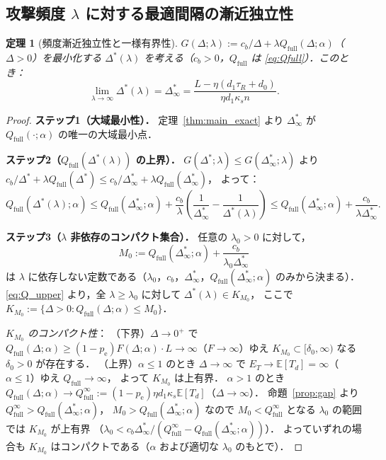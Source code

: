 \documentclass[12pt,a4paper]{article}
\theoremstyle{plain}
\newtheorem{theorem}{定理}[section]
\theoremstyle{definition}
\theoremstyle{remark}
\newcommand{\E}{\mathbb{E}}
\newcommand{\pe}{p_{\mathrm{e}}}
\newcommand{\Qf}{Q_{\mathrm{full}}}
\newcommand{\Dopt}{\Delta^{*}}
\newcommand{\Dinf}{\Delta^{*}_{\infty}}
\begin{document}
\subsection{攻撃頻度 $\lambda$ に対する最適間隔の漸近独立性}

\begin{theorem}[頻度漸近独立性と一様有界性]\label{thm:convergence}
$G(\Delta;\lambda):=c_b/\Delta+\lambda\Qf(\Delta;\alpha)$（$\Delta>0$）を最小化する
$\Dopt(\lambda)$ を考える（$c_b>0$，$\Qf$ は \eqref{eq:Qfull}）．このとき：
\begin{equation}\label{eq:limit}
\lim_{\lambda\to\infty}\Dopt(\lambda)=\Dinf=\frac{L-\eta(d_1\tau_R+d_0)}{\eta d_1\kappa_s n}.
\end{equation}
\end{theorem}

\begin{proof}
\textbf{ステップ1（大域最小性）．}
定理~\ref{thm:main_exact} より $\Dinf$ が $\Qf(\cdot;\alpha)$ の唯一の大域最小点．

\textbf{ステップ2（$\Qf(\Dopt(\lambda))$ の上界）．}
$G(\Dopt;\lambda)\le G(\Dinf;\lambda)$ より
$c_b/\Dopt+\lambda\Qf(\Dopt)\le c_b/\Dinf+\lambda\Qf(\Dinf)$，
よって：
\begin{equation}\label{eq:Q_upper}
\Qf(\Dopt(\lambda);\alpha)\le\Qf(\Dinf;\alpha)+\frac{c_b}{\lambda}\left(\frac{1}{\Dinf}-\frac{1}{\Dopt(\lambda)}\right)
\le\Qf(\Dinf;\alpha)+\frac{c_b}{\lambda\Dinf}.
\end{equation}

\textbf{ステップ3（$\lambda$ 非依存のコンパクト集合）．}
任意の $\lambda_0>0$ に対して，
\begin{equation}\label{eq:M0}
M_0:=\Qf(\Dinf;\alpha)+\frac{c_b}{\lambda_0\Dinf}
\end{equation}
は $\lambda$ に依存しない定数である（$\lambda_0$，$c_b$，$\Dinf$，$\Qf(\Dinf;\alpha)$ のみから決まる）．
\eqref{eq:Q_upper} より，全 $\lambda\ge\lambda_0$ に対して $\Dopt(\lambda)\in K_{M_0}$，
ここで $K_{M_0}:=\{\Delta>0:\Qf(\Delta;\alpha)\le M_0\}$．

\emph{$K_{M_0}$ のコンパクト性}：
（下界）$\Delta\to0^+$ で $\Qf(\Delta;\alpha)\ge(1-\pe)F(\Delta;\alpha)\cdot L\to\infty$（$F\to\infty$）ゆえ
$K_{M_0}\subset[\delta_0,\infty)$ なる $\delta_0>0$ が存在する．
（上界）$\alpha\le1$ のとき $\Delta\to\infty$ で $E_T\to\E[T_d]=\infty$（$\alpha\le1$）ゆえ $\Qf\to\infty$，
よって $K_{M_0}$ は上有界．
$\alpha>1$ のとき $\Qf(\Delta;\alpha)\to\Qf^\infty:=(1-\pe)\eta d_1\kappa_s\E[T_d]$（$\Delta\to\infty$）．
命題~\ref{prop:gap} より $\Qf^\infty>\Qf(\Dinf;\alpha)$，
$M_0>\Qf(\Dinf;\alpha)$ なので $M_0<\Qf^\infty$ となる $\lambda_0$ の範囲では $K_{M_0}$ が上有界
（$\lambda_0<c_b\Dinf/(\Qf^\infty-\Qf(\Dinf;\alpha))$）．
よっていずれの場合も $K_{M_0}$ はコンパクトである（$\alpha$ および適切な $\lambda_0$ のもとで）．


\end{proof}
\end{document}
